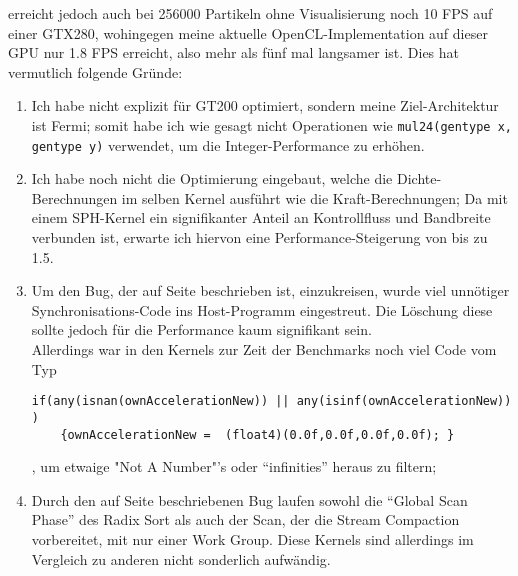 	\cite{Goswami2010} erreicht jedoch auch bei 256000 Partikeln ohne Visualisierung noch 10 FPS auf einer GTX280,
	wohingegen meine aktuelle OpenCL-Implementation auf dieser GPU nur 1.8 FPS erreicht, 
	also mehr als fünf mal langsamer ist.
	Dies hat vermutlich folgende Gründe:
	\begin{enumerate}
		\item Ich habe nicht explizit für GT200 optimiert, sondern meine Ziel-Architektur ist Fermi;
		somit habe ich wie gesagt nicht Operationen wie \lstinline|mul24(gentype x, gentype y)| verwendet,
		um die Integer-Performance zu erhöhen.
		\item Ich habe noch nicht die Optimierung eingebaut, welche die Dichte-Berechnungen im selben
		Kernel ausführt wie die Kraft-Berechnungen; Da mit einem SPH-Kernel ein signifikanter 
		Anteil an Kontrollfluss und	Bandbreite verbunden ist, erwarte ich hiervon eine Performance-Steigerung von 
		bis zu 1.5.
		\item Um den Bug, der auf Seite \pageref{enum:oclSyncBug} beschrieben ist, einzukreisen, wurde viel unnötiger 
		Synchronisations-Code ins Host-Programm eingestreut. Die Löschung diese sollte jedoch
		für die Performance kaum signifikant sein.\\
		Allerdings war in den Kernels zur Zeit der Benchmarks noch viel Code vom Typ
		\begin{lstlisting}
if(any(isnan(ownAccelerationNew)) || any(isinf(ownAccelerationNew)) ) 
	{ownAccelerationNew =  (float4)(0.0f,0.0f,0.0f,0.0f); }
		\end{lstlisting}
		, um etwaige "Not A Number"'s oder "`infinities"' heraus zu filtern; 
		
		\item
		Durch den auf Seite \pageref{enum:oclSyncBug} beschriebenen Bug laufen sowohl die "`Global Scan Phase"'
		des Radix Sort als auch der Scan, der die Stream Compaction vorbereitet, mit nur einer Work Group.
		Diese Kernels sind allerdings im Vergleich zu anderen nicht sonderlich aufwändig.
		

\end{enumerate}

